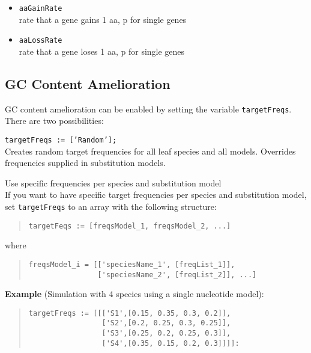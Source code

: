 \documentclass[11pt]{article}
\begin{document}
\begin{itemize}
\item{\texttt{aaGainRate}} \hfill \\
rate that a gene gains 1 aa, p for single genes
\item{\texttt{aaLossRate}} \hfill \\
rate that a gene loses 1 aa, p for single genes
\end{itemize}

\subsection{GC Content Amelioration}
GC content amelioration can be enabled by setting the variable \texttt{targetFreqs}. There are two possibilities:
\begin{description}
\item{\texttt{targetFreqs := ['Random'];}} \hfill \\
Creates random target frequencies for all leaf species and all models. Overrides frequencies supplied in substitution models.

\item{Use specific frequencies per species and substitution model} \hfill \\
If you want to have specific target frequencies per species and substitution model, set \texttt{targetFreqs} to an array with the following structure:
\begin{quote}
\begin{verbatim}
targetFeqs := [freqsModel_1, freqsModel_2, ...]
\end{verbatim}
\end{quote}
where
\begin{quote}
\begin{verbatim}
freqsModel_i = [['speciesName_1', [freqList_1]],
                ['speciesName_2', [freqList_2]], ...]
\end{verbatim}
\end{quote}

\noindent \textbf{Example} (Simulation with 4 species using a single nucleotide model):
\begin{quote}
\begin{verbatim}
targetFreqs := [[['S1',[0.15, 0.35, 0.3, 0.2]],
                 ['S2',[0.2, 0.25, 0.3, 0.25]],
                 ['S3',[0.25, 0.2, 0.25, 0.3]],
                 ['S4',[0.35, 0.15, 0.2, 0.3]]]]:
\end{verbatim}
\end{quote}
\end{description}
\end{document}
